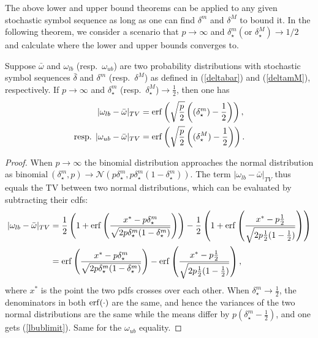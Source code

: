 The above lower and upper bound theorems can be applied to any given stochastic symbol sequence as long as one can find $\delta^m$ and $\delta^M$ to bound it. In the following theorem, we consider a scenario that $p \to \infty$ and
$\delta^m_\star (\text{or } \delta^M_\star)\to 1/2$ and calculate where the lower and upper bounds converges to.

\begin{theorem}
\label{theoremapproxlb} Suppose $\bar{\omega}$ and $\omega_{lb}$ (resp.\ $\omega_{ub}$) are two probability distributions with stochastic symbol sequences $\bar{\delta}$ and $\delta^m$ (resp.\ $\delta^M$) as defined in (\ref{deltabar}) and (\ref{deltamM}), respectively. If $p
\to \infty$ and $\delta^m_{\star}$ (resp.\ $\delta^M_{\star}$)$ \to \frac{1}{2}$, then one has
\begin{align}
\begin{split}
  \label{lbublimit}
                 |\omega_{lb}-\bar{\omega}|_{TV}
               & =  \operatorname{erf} \left( \sqrt{\frac{p}{2}}\left((\delta_{\star}^m)-\frac{1}{2}\right)\right), \\
  \text{resp. }  |\omega_{ub}-\bar{\omega}|_{TV}
               & =  \operatorname{erf} \left( \sqrt{\frac{p}{2}}\left((\delta_{\star}^M)-\frac{1}{2}\right)\right).
\end{split}
\end{align}


\end{theorem}
\begin{proof}
When $p\to \infty$ the binomial distribution approaches the normal distribution as $\text{binomial}\ (\delta^m_{\star},p) \to \mathcal{N}(p\delta^m_{\star}, p\delta^m_{\star}(1-\delta^m_{\star}))$.  The term $|\omega_{lb}-\bar{\omega}|_{TV}$ thus equals the TV between two normal distributions, which can be evaluated by subtracting their cdfs: %
\begin{align}
  |\omega_{lb}-\bar{\omega}|_{TV}
              &=  \frac{1}{2}\left(1+\operatorname{erf}\left(\frac{x^*-p\delta_{\star}^m}{\sqrt{2p\delta_{\star}^m(1-\delta_{\star}^m)}}\right)\right)
                       -\frac{1}{2}\left(1+\operatorname{erf}\left(\frac{x^*-p\frac{1}{2}}{\sqrt{2p\frac{1}{2}(1-\frac{1}{2})}}\right)\right) \nonumber\\
              &=\operatorname{erf}\left(\frac{x^*-p\delta_{\star}^m}{\sqrt{2p\delta_{\star}^m(1-\delta_{\star}^m)}}\right)-
                       \operatorname{erf}\left(\frac{x^*-p\frac{1}{2}}{\sqrt{2p\frac{1}{2}(1-\frac{1}{2})}}\right),
\end{align}
where $x^*$ is the point the two pdfs crosses over each other. When $\delta_{\star}^m \to \frac{1}{2}$, the denominators in both
$\operatorname{erf}(\cdot)$ are the same, and hence the variances of the two normal distributions are the same while the means differ by
$p(\delta^m_{\star}-\frac{1}{2})$, and one gets (\ref{lbublimit}). Same for the $\omega_{ub}$ equality.

\end{proof}




